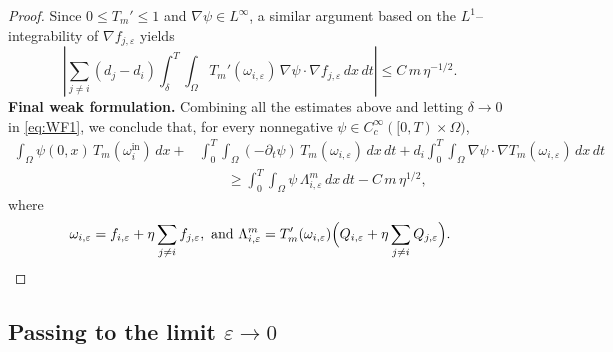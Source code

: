 \documentclass[a4paper,12pt,reqno]{amsart}
\theoremstyle{plain}
\numberwithin{equation}{section}
\begin{document}
\begin{proof}
		Since \(0\le T_m'\le1\) and \(\nabla\psi\in L^\infty\), a similar argument
		based on the $L^1$–integrability of \(\nabla f_{j,\varepsilon}\) yields
		\[
		\left|
		\sum_{j\ne i}(d_j-d_i)
		\int_{\delta}^{T}\!\!\int_{\Omega}
		T_m'(\omega_{i,\varepsilon})\,
		\nabla\psi\cdot\nabla f_{j,\varepsilon}\,dx\,dt
		\right|
		\le
		C\,m\,\eta^{-1/2}.
		\]
		\noindent\textbf{Final weak formulation.}
		Combining all the estimates above and letting $\delta \to 0$ in \eqref{eq:WF1}, we
		conclude that, for every nonnegative $\psi\in C_c^\infty([0,T)\times\Omega)$,
		\begin{align*}
			\int_{\Omega}\psi(0,x)\,T_m(\omega_i^{\mathrm{in}})\,dx
			+ &
			\int_{0}^{T}\!\!\int_{\Omega}
			(-\partial_t\psi)\,T_m(\omega_{i,\varepsilon})\,dx\,dt 
			+
			d_i\int_{0}^{T}\!\!\int_{\Omega}
			\nabla\psi\cdot\nabla T_m(\omega_{i,\varepsilon})\,dx\,dt
			\\
			&\qquad\ge
			\int_{0}^{T}\!\!\int_{\Omega}
			\psi\,\Lambda^{m}_{i,\varepsilon}\,dx\,dt
			-
			C\,m\,\eta^{1/2},
		\end{align*}
		where
		\[
		\omega_{i,\varepsilon}
		=
		f_{i,\varepsilon}
		+
		\eta \sum_{j\ne i} f_{j,\varepsilon},
		\ \text{and} \ 
		\Lambda^{m}_{i,\varepsilon}
		=
		T_m'(\omega_{i,\varepsilon})
		\Bigl(
		Q_{i,\varepsilon}
		+
		\eta \sum_{j\ne i} Q_{j,\varepsilon}
		\Bigr).
		\]
	\end{proof}
	
	\subsection{Passing to the limit \texorpdfstring{$\varepsilon \to 0$}{epsilon to zero}}
	
\end{document}
